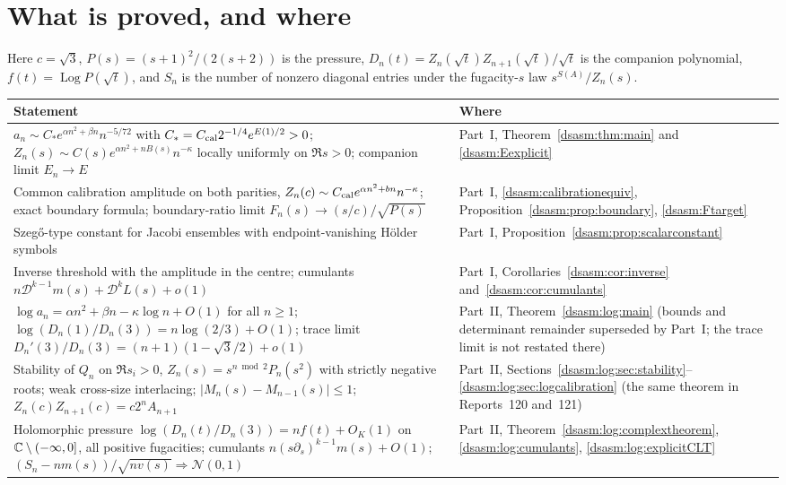 \documentclass[11pt,letterpaper]{article}
\theoremstyle{remark}\newtheorem{remark}[theorem]{Remark}
\DeclareMathOperator{\Log}{Log}\DeclareMathOperator{\Var}{Var}
\begin{document}
\section*{What is proved, and where}\label{dsasm:sec:status}
Here $c=\sqrt3$, $P(s)=(s+1)^2/(2(s+2))$ is the pressure, $D_n(t)=Z_n(\sqrt t)Z_{n+1}(\sqrt t)/\sqrt t$ is the companion polynomial, $f(t)=\Log P(\sqrt t)$, and $S_n$ is the number of nonzero diagonal entries under the fugacity-$s$ law $s^{S(A)}/Z_n(s)$.
\begin{center}
\small
\begin{tabular}{@{}>{\raggedright\arraybackslash}p{} >{\raggedright\arraybackslash}p{}@{}}
\toprule
Statement & Where\\
\midrule
$a_n\sim C_*e^{\alpha n^2+\beta n}n^{-5/72}$ with $C_*=C_{\rm cal}2^{-1/4}e^{E(1)/2}>0$; $Z_n(s)\sim C(s)e^{\alpha n^2+nB(s)}n^{-\kappa}$ locally uniformly on $\Re s>0$; companion limit $E_n\to E$ & Part~I, Theorem~\ref{dsasm:thm:main} and \eqref{dsasm:Eexplicit}\\
Common calibration amplitude on both parities, $Z_n(c)\sim C_{\rm cal}e^{\alpha n^2+bn}n^{-\kappa}$; exact boundary formula; boundary-ratio limit $F_n(s)\to(s/c)/\sqrt{P(s)}$ & Part~I, \eqref{dsasm:calibrationequiv}, Proposition~\ref{dsasm:prop:boundary}, \eqref{dsasm:Ftarget}\\
Szeg\H{o}-type constant for Jacobi ensembles with endpoint-vanishing H\"older symbols & Part~I, Proposition~\ref{dsasm:prop:scalarconstant}\\
Inverse threshold with the amplitude in the centre; cumulants $n\mathcal D^{k-1}m(s)+\mathcal D^kL(s)+o(1)$ & Part~I, Corollaries~\ref{dsasm:cor:inverse} and~\ref{dsasm:cor:cumulants}\\
$\log a_n=\alpha n^2+\beta n-\kappa\log n+O(1)$ for all $n\ge1$; $\log(D_n(1)/D_n(3))=n\log(2/3)+O(1)$; trace limit $D_n'(3)/D_n(3)=(n+1)(1-\sqrt3/2)+o(1)$ & Part~II, Theorem~\ref{dsasm:log:main} (bounds and determinant remainder superseded by Part~I; the trace limit is not restated there)\\
Stability of $Q_n$ on $\Re s_i>0$, $Z_n(s)=s^{n\bmod2}P_n(s^2)$ with strictly negative roots; weak cross-size interlacing; $|M_n(s)-M_{n-1}(s)|\le1$; $Z_n(c)Z_{n+1}(c)=c2^nA_{n+1}$ & Part~II, Sections~\ref{dsasm:log:sec:stability}--\ref{dsasm:log:sec:logcalibration} (the same theorem in Reports~120 and~121)\\
Holomorphic pressure $\log(D_n(t)/D_n(3))=nf(t)+O_K(1)$ on $\mathbb C\setminus(-\infty,0]$, all positive fugacities; cumulants $n(s\partial_s)^{k-1}m(s)+O(1)$; $(S_n-nm(s))/\sqrt{nv(s)}\Rightarrow\mathcal N(0,1)$ & Part~II, Theorem~\ref{dsasm:log:complextheorem}, \eqref{dsasm:log:cumulants}, \eqref{dsasm:log:explicitCLT}\\

\end{tabular}
\end{center}
\end{document}
